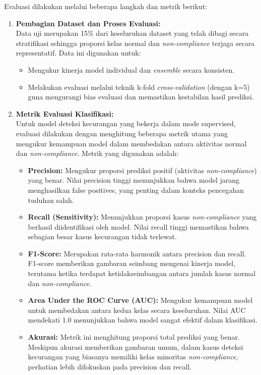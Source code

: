 Evaluasi dilakukan melalui beberapa langkah dan metrik berikut:

\begin{enumerate}
    \item \textbf{Pembagian Dataset dan Proses Evaluasi:} \\
    Data uji merupakan 15\% dari keseluruhan dataset yang telah dibagi secara stratifikasi sehingga proporsi kelas normal dan \textit{non-compliance} terjaga secara representatif. Data ini digunakan untuk:
    \begin{itemize}
        \item Mengukur kinerja model individual dan \textit{ensemble} secara konsisten.
        \item Melakukan evaluasi melalui teknik k-fold \textit{cross-validation} (dengan k=5) guna mengurangi bias evaluasi dan memastikan kestabilan hasil prediksi.
    \end{itemize}

    \item \textbf{Metrik Evaluasi Klasifikasi:} \\
    Untuk model deteksi kecurangan yang bekerja dalam mode supervised, evaluasi dilakukan dengan menghitung beberapa metrik utama yang mengukur kemampuan model dalam membedakan antara aktivitas normal dan \textit{non-compliance}. Metrik yang digunakan adalah:
    \begin{itemize}
        \item \textbf{Precision:} Mengukur proporsi prediksi positif (aktivitas \textit{non-compliance}) yang benar. Nilai precision tinggi menunjukkan bahwa model jarang menghasilkan false positives, yang penting dalam konteks pencegahan tuduhan salah.
        \item \textbf{Recall (Sensitivity):} Menunjukkan proporsi kasus \textit{non-compliance} yang berhasil diidentifikasi oleh model. Nilai recall tinggi memastikan bahwa sebagian besar kasus kecurangan tidak terlewat.
        \item \textbf{F1-Score:} Merupakan rata-rata harmonik antara precision dan recall. F1-score memberikan gambaran seimbang mengenai kinerja model, terutama ketika terdapat ketidakseimbangan antara jumlah kasus normal dan \textit{non-compliance}.
        \item \textbf{Area Under the ROC Curve (AUC):} Mengukur kemampuan model untuk membedakan antara kedua kelas secara keseluruhan. Nilai AUC mendekati 1.0 menunjukkan bahwa model sangat efektif dalam klasifikasi.
        \item \textbf{Akurasi:} Metrik ini menghitung proporsi total prediksi yang benar. Meskipun akurasi memberikan gambaran umum, dalam kasus deteksi kecurangan yang biasanya memiliki kelas minoritas \textit{non-compliance}, perhatian lebih difokuskan pada precision dan recall.
    \end{itemize}


\end{enumerate}
